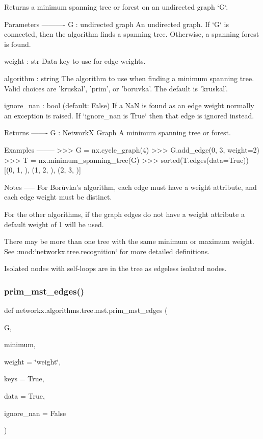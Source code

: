\begin{DoxyVerb}Returns a minimum spanning tree or forest on an undirected graph `G`.

Parameters
----------
G : undirected graph
    An undirected graph. If `G` is connected, then the algorithm finds a
    spanning tree. Otherwise, a spanning forest is found.

weight : str
   Data key to use for edge weights.

algorithm : string
   The algorithm to use when finding a minimum spanning tree. Valid
   choices are 'kruskal', 'prim', or 'boruvka'. The default is
   'kruskal'.

ignore_nan : bool (default: False)
    If a NaN is found as an edge weight normally an exception is raised.
    If `ignore_nan is True` then that edge is ignored instead.

Returns
-------
G : NetworkX Graph
   A minimum spanning tree or forest.

Examples
--------
>>> G = nx.cycle_graph(4)
>>> G.add_edge(0, 3, weight=2)
>>> T = nx.minimum_spanning_tree(G)
>>> sorted(T.edges(data=True))
[(0, 1, {}), (1, 2, {}), (2, 3, {})]


Notes
-----
For Borůvka's algorithm, each edge must have a weight attribute, and
each edge weight must be distinct.

For the other algorithms, if the graph edges do not have a weight
attribute a default weight of 1 will be used.

There may be more than one tree with the same minimum or maximum weight.
See :mod:`networkx.tree.recognition` for more detailed definitions.

Isolated nodes with self-loops are in the tree as edgeless isolated nodes.\end{DoxyVerb}
 \mbox{\label{namespacenetworkx_1_1algorithms_1_1tree_1_1mst_afcb5cc4ca6b18390fbea4b2f2a64055b}} 
\subsubsection{\texorpdfstring{prim\+\_\+mst\+\_\+edges()}{prim\_mst\_edges()}}
{\footnotesize\ttfamily def networkx.\+algorithms.\+tree.\+mst.\+prim\+\_\+mst\+\_\+edges (\begin{DoxyParamCaption}\item[{}]{G,  }\item[{}]{minimum,  }\item[{}]{weight = {\ttfamily \char`\"{}weight\char`\"{}},  }\item[{}]{keys = {\ttfamily True},  }\item[{}]{data = {\ttfamily True},  }\item[{}]{ignore\+\_\+nan = {\ttfamily False} }\end{DoxyParamCaption})}

